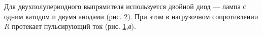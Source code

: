 \documentclass[a4paper,10pt]{book}
\begin{document}
\begin{figure}[h]
	\caption{}
	\label{pic45}
\end{figure}

Для двухполупериодного выпрямителя используется двойной диод — лампа с одним катодом и двумя анодами (рис. \ref{pic46}). При этом в нагрузочном сопротивлении $R$ протекает пульсирующий ток (рис. \ref{pic45},\textit{в}). 

\begin{figure}[h]
	\caption{}
	\label{pic46}
\end{figure}
\end{document}
